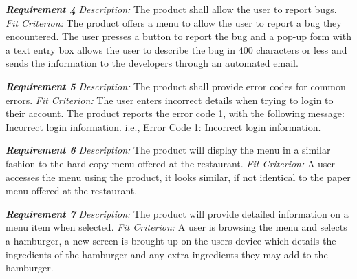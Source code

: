 \documentclass[12pt, titlepage]{article}
\begin{document}
\noindent\textbf{\textit{Requirement 4}}\newline
\textit{Description:}\newline
The product shall allow the user to report bugs. \newline\newline
\textit{Fit Criterion:}\newline 
The product offers a menu to allow the user to report a bug they encountered. The user presses a button to report the bug and a pop-up form with a text entry box allows the user to describe the bug in 400 characters or less and sends the information to the developers through an automated email.
\newline

\noindent\textbf{\textit{Requirement 5}}\newline
\textit{Description:}\newline
The product shall provide error codes for common errors. \newline\newline
\textit{Fit Criterion:}\newline 
The user enters incorrect details when trying to login to their account. The product reports the error code 1, with the following message: Incorrect login information. i.e., Error Code 1: Incorrect login information.
\newline

\noindent\textbf{\textit{Requirement 6}}\newline
\textit{Description:}\newline
The product will display the menu in a similar fashion to the hard copy menu offered at the restaurant. \newline\newline
\textit{Fit Criterion:}\newline 
A user accesses the menu using the product, it looks similar, if not identical to the paper menu offered at the restaurant.
\newline

\noindent\textbf{\textit{Requirement 7}}\newline
\textit{Description:}\newline
The product will provide detailed information on a menu item when selected. \newline\newline
\textit{Fit Criterion:}\newline 
A user is browsing the menu and selects a hamburger, a new screen is brought up on the users device which details the ingredients of the hamburger and any extra ingredients they may add to the hamburger.
\newline
\end{document}
